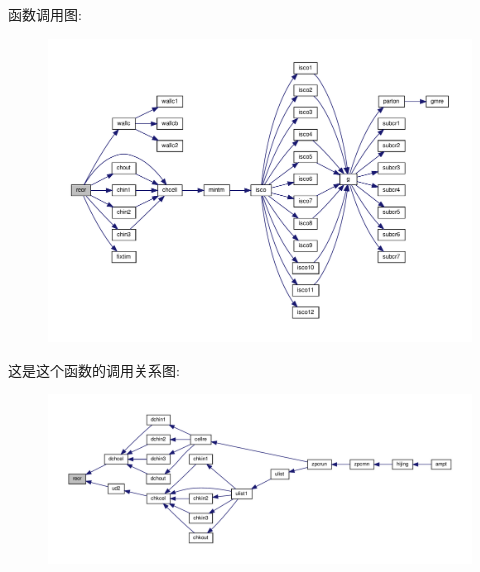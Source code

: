 函数调用图\+:
\nopagebreak
\begin{figure}[H]
\begin{center}
\leavevmode
\includegraphics[width=350pt]{reor_8f90_ab933c94c3120c674e0a9b426eaa44bf1_cgraph}
\end{center}
\end{figure}
这是这个函数的调用关系图\+:
\nopagebreak
\begin{figure}[H]
\begin{center}
\leavevmode
\includegraphics[width=350pt]{reor_8f90_ab933c94c3120c674e0a9b426eaa44bf1_icgraph}
\end{center}
\end{figure}
